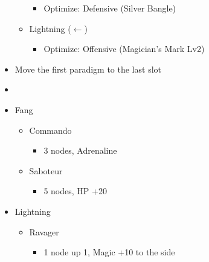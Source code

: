 \begin{paracol}{2}
\begin{menu}
\begin{itemize}
\begin{itemize}
\begin{itemize}
					      \item Optimize: Defensive (Silver Bangle)
				      \end{itemize}
				\item Lightning ($\leftarrow$)
				      \begin{itemize}
					      \item Optimize: Offensive (Magician's Mark Lv2)
				      \end{itemize}
			\end{itemize}
		\end{itemize}
	\end{menu}
	\switchcolumn
	\begin{menu}
		\begin{itemize}
			\paradigm
			\begin{itemize}
				\item Move the first paradigm to the last slot
				\item {}%
				      {\paradigmline{[\com]}{\com}{\rav}}
				      {\paradigmline{[\com]}{\rav}{\rav}}%
				      {\paradigmline{(\sab)}{(\rav)}{\rav}}%
				      {\paradigmline{\sen}{(\rav)}{(\rav)}}%
				      {\paradigmline[5]{\textit{\sab}}{\textit{(\rav)}}{\textit{\syn}}}%
				      {\paradigmline{\com}{\rav}{\rav}}
			\end{itemize}
			\crystarium
			\begin{itemize}
				\item Fang
				      \begin{itemize}
					      \item Commando
					            \begin{itemize}
						            \item 3 nodes, Adrenaline
					            \end{itemize}
					      \item Saboteur
					            \begin{itemize}
						            \item 5 nodes, HP +20
					            \end{itemize}
				      \end{itemize}
				\item Lightning
				      \begin{itemize}
					      \item Ravager
					            \begin{itemize}
						            \item 1 node up 1, Magic +10 to the side

\end{itemize}
\end{itemize}
\end{itemize}
\end{itemize}
\end{menu}
\end{paracol}
